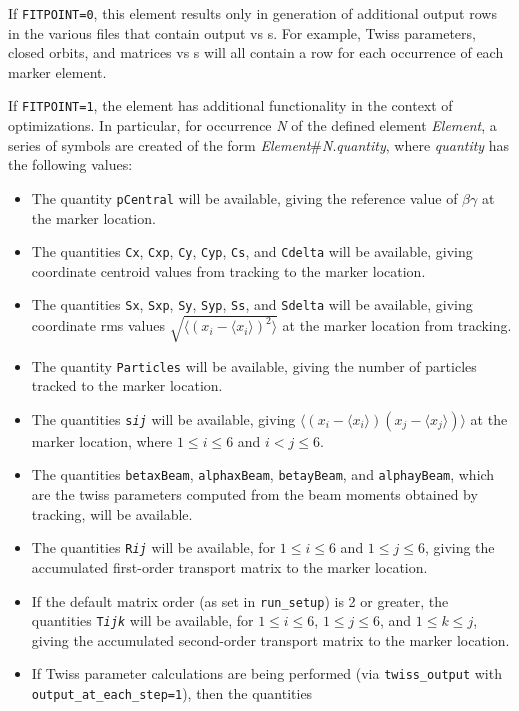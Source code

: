 If {\tt FITPOINT=0}, this element results only in generation of additional output rows in the various 
files that contain output vs s.  For example, Twiss parameters, closed orbits, and matrices vs s will
all contain a row for each occurrence of  each marker element.

If {\tt FITPOINT=1}, the element has additional functionality in the context of optimizations.  In particular,
for occurrence {\em N} of the defined element {\em Element}, a series of symbols are created of the
form {\em Element}\#{\em N}.{\em quantity}, where {\em quantity} has the following values:
\begin{itemize}
\item The quantity {\tt pCentral} will be available, giving the reference value of $\beta\gamma$ at the marker location.
\item The quantities {\tt Cx}, {\tt Cxp}, {\tt Cy}, {\tt Cyp}, {\tt Cs}, and {\tt Cdelta} will be available,
 giving coordinate centroid values from tracking to the marker location.
\item The quantities {\tt Sx}, {\tt Sxp}, {\tt Sy}, {\tt Syp}, {\tt Ss}, and {\tt Sdelta} will be available,
 giving coordinate rms values $\sqrt{\langle (x_i - \langle x_i \rangle)^2\rangle}$ at the marker location from tracking.
\item The quantity {\tt Particles} will be available, giving the number of particles tracked to the marker location.
\item The quantities {\tt s{\em i}{\em j}} will be available, giving $\langle ( x_i -\langle x_i\rangle)( x_j - \langle x_j \rangle)\rangle$
 at the marker location, where $1\leq i\leq 6$ and $i<j\leq 6$.
\item The quantities {\tt betaxBeam}, {\tt alphaxBeam}, {\tt betayBeam}, and {\tt alphayBeam}, which are the twiss parameters computed
      from the beam moments obtained by tracking, will be available.
\item The quantities {\tt R{\em i}{\em j}} will be available, for $1\leq i \leq 6$ and $1\leq j \leq 6$,
  giving the accumulated first-order transport matrix to the marker location.
\item If the default matrix order (as set in {\tt run\_setup}) is 2 or greater, the quantities {\tt T{\em i}{\em j}{\em k}} 
  will be available, for $1\leq i \leq 6$, $1\leq j \leq 6$, and $1\leq k \leq j$,
  giving the accumulated second-order transport matrix to the marker location.
\item If Twiss parameter calculations are being performed (via {\tt twiss\_output} with {\tt output\_at\_each\_step=1}), then the quantities

\end{itemize}
